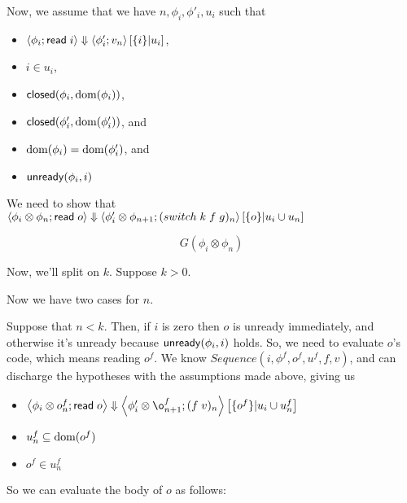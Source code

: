 \documentclass{article}
\begin{document}
Now, we assume that we have $n, \phi_i, \phi'_i, u_i$ such that

\begin{itemize}
\item $\left<{\phi_i};{\mbox{\textsf{{read}}}\; i}\right>\Downarrow\left<{\phi'_i};{v_n}\right>\left[{\{{i}\}}|{u_i}\right]$, 
\item $i \in u_i$, 
\item $\mbox{\textsf{{closed}}}({\phi_i}, {\mbox{dom}({\phi_i})})$,
\item $\mbox{\textsf{{closed}}}({\phi'_i}, {\mbox{dom}({\phi'_i})})$, and
\item $\mbox{dom}({\phi_i}) = \mbox{dom}({\phi'_i})$, and
\item $\mbox{\textsf{{unready}}}({\phi_i}, {i})$
\end{itemize}

We need to show that $\left<{\phi_i \otimes \phi_n};{\mbox{\textsf{{read}}}\; o}\right>\Downarrow\left<{\phi'_i \otimes \phi_{n+1}};{(switch\;k\;f\;g)_n}\right>\left[{\{{o}\}}|{u_i \cup u_n}\right]$

\begin{displaymath}
G(\phi_i \otimes \phi_n)  
\end{displaymath}

Now, we'll split on $k$. Suppose $k > 0$. 

Now we have two cases for $n$. 

Suppose that $n < k$. Then, if $i$ is zero then $o$ is unready
immediately, and otherwise it's unready because $\mbox{\textsf{{unready}}}({\phi_i}, {i})$
holds. So, we need to evaluate $o$'s code, which means reading
$o^f$. We know $Sequence(i, \phi^f, o^f, u^f, f, v)$, and can
discharge the hypotheses with the assumptions made above, giving us

\begin{itemize}
\item $\astep{\phi_i \otimes o^f_n}{\readcell o}
             {\phi'_i \otimes \o^f_{n+1}}{(f\;v)_n}
             {\setof{o^f}}{u_i \cup u^f_n}$
\item $u^f_n \subseteq \mbox{dom}({o^f})$
\item $o^f \in u^f_n$
\end{itemize}


So we can evaluate the body of $o$ as follows:
\end{document}
